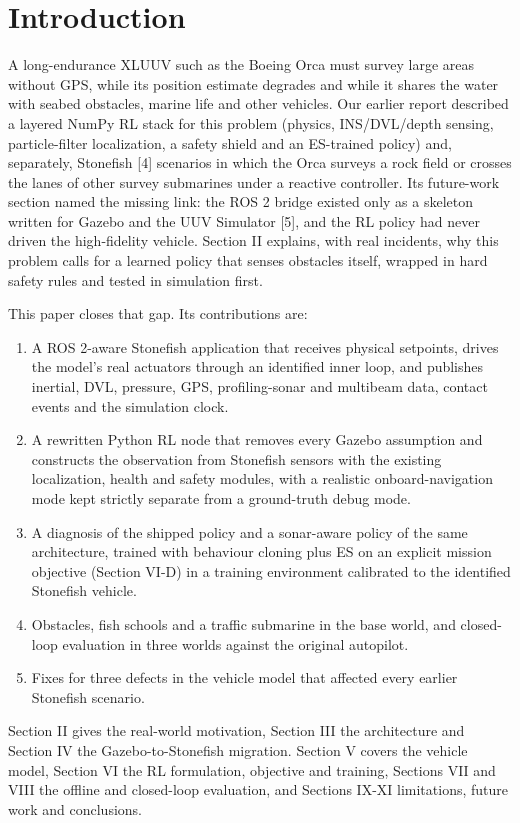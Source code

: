 \documentclass[conference]{IEEEtran}
\begin{document}
\section{Introduction}
A long-endurance XLUUV such as the Boeing Orca must survey large areas without GPS, while its position estimate degrades and while it shares the water with seabed obstacles, marine life and other vehicles. Our earlier report described a layered NumPy RL stack for this problem (physics, INS/DVL/depth sensing, particle-filter localization, a safety shield and an ES-trained policy) and, separately, Stonefish [4] scenarios in which the Orca surveys a rock field or crosses the lanes of other survey submarines under a reactive controller. Its future-work section named the missing link: the ROS 2 bridge existed only as a skeleton written for Gazebo and the UUV Simulator [5], and the RL policy had never driven the high-fidelity vehicle. Section II explains, with real incidents, why this problem calls for a learned policy that senses obstacles itself, wrapped in hard safety rules and tested in simulation first.

This paper closes that gap. Its contributions are:

\begin{enumerate}\item A ROS 2-aware Stonefish application that receives physical setpoints, drives the model's real actuators through an identified inner loop, and publishes inertial, DVL, pressure, GPS, profiling-sonar and multibeam data, contact events and the simulation clock.\item A rewritten Python RL node that removes every Gazebo assumption and constructs the observation from Stonefish sensors with the existing localization, health and safety modules, with a realistic onboard-navigation mode kept strictly separate from a ground-truth debug mode.\item A diagnosis of the shipped policy and a sonar-aware policy of the same architecture, trained with behaviour cloning plus ES on an explicit mission objective (Section VI-D) in a training environment calibrated to the identified Stonefish vehicle.\item Obstacles, fish schools and a traffic submarine in the base world, and closed-loop evaluation in three worlds against the original autopilot.\item Fixes for three defects in the vehicle model that affected every earlier Stonefish scenario.\end{enumerate}
Section II gives the real-world motivation, Section III the architecture and Section IV the Gazebo-to-Stonefish migration. Section V covers the vehicle model, Section VI the RL formulation, objective and training, Sections VII and VIII the offline and closed-loop evaluation, and Sections IX-XI limitations, future work and conclusions.
\end{document}
